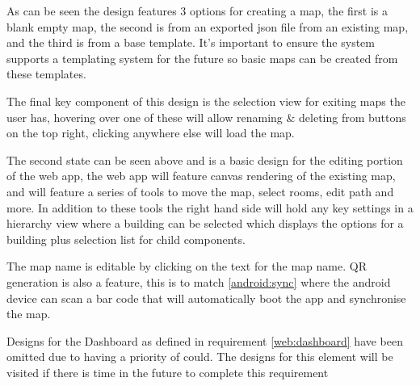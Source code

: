 As can be seen the design features 3 options for creating a map, the first is a blank empty map, the second is from an exported json file from an existing map, and the third is from a base template. It's important to ensure the system supports a templating system for the future so basic maps can be created from these templates.


The final key component of this design is the selection view for exiting maps the user has, hovering over one of these will allow renaming \& deleting from buttons on the top right, clicking anywhere else will load the map.

The second state can be seen above and is a basic design for the editing portion of the web app, the web app will feature canvas rendering of the existing map, and will feature a series of tools to move the map, select rooms, edit path and more. In addition to these tools the right hand side will hold any key settings in a hierarchy view where a building can be selected which displays the options for a building plus selection list for child components. 

The map name is editable by clicking on the text for the map name. QR generation is also a feature, this is to match \ref{android:sync} where the android device can scan a bar code that will automatically boot the app and synchronise the map.

Designs for the Dashboard as defined in requirement \ref{web:dashboard} have been omitted due to having a priority of could. The designs for this element will be visited if there is time in the future to complete this requirement

